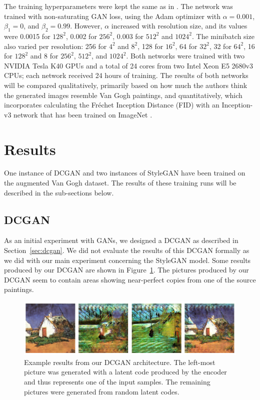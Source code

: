 \documentclass{article}
\begin{document}
The training hyperparameters were kept the same as in \cite{karras2019stylebased}. The network was trained with non-saturating GAN loss, using the Adam optimizer \cite{kingma2015adam} with $\alpha = 0.001$, $\beta_1 = 0$, and $\beta_2 = 0.99$. However, $\alpha$ increased with resolution size, and its values were 0.0015 for $128^2$, 0.002 for $256^2$, 0.003 for $512^2$ and $1024^2$. The minibatch size also varied per resolution: 256 for $4^2$ and $8^2$, 128 for $16^2$, 64 for $32^2$, 32 for $64^2$, 16 for $128^2$ and 8 for $256^2$, $512^2$, and $1024^2$. Both networks were trained with two NVIDIA Tesla K40 GPUs and a total of 24 cores from two Intel Xeon E5 2680v3 CPUs; each network received 24 hours of training. The results of both networks will be compared qualitatively, primarily based on how much the authors think the generated images resemble Van Gogh paintings, and quantitatively, which incorporates calculating the Fréchet Inception Distance (FID) \cite{heusel2017frechet} with an Inception-v3 network \cite{szegedy2016inception} that has been trained on ImageNet \cite{imagenet2009}.

\section{Results}
One instance of DCGAN and two instances of StyleGAN have been trained on the augmented Van Gogh dataset. The results of these training runs will be described in the sub-sections below.

\subsection{DCGAN}
As an initial experiment with GANs, we designed a DCGAN as described in Section~\ref{sec:dcgan}. We did not evaluate the results of this DCGAN formally as we did with our main experiment concerning the StyleGAN model. Some results produced by our DCGAN are shown in Figure~\ref{fig:dcgan}. The pictures produced by our DCGAN seem to contain areas showing near-perfect copies from one of the source paintings.

\begin{figure}[h]
    \centering
    \includegraphics[width=0.7\linewidth]{report/img/dcgan2.png}
    \caption{Example results from our DCGAN architecture. The left-most picture was generated with a latent code produced by the encoder and thus represents one of the input samples. The remaining pictures were generated from random latent codes.}
    \label{fig:dcgan}
\end{figure}
\end{document}
